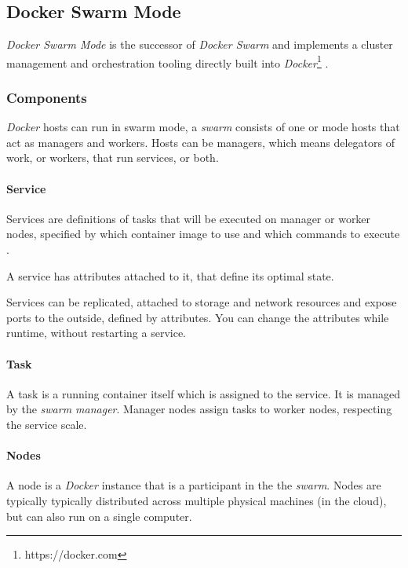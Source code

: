 \subsection{Docker Swarm Mode}\label{docker-swarm-mode}

\emph{Docker Swarm Mode} is the successor of \emph{Docker Swarm} and
implements a cluster management and orchestration tooling directly built
into \emph{Docker}\footnote{https://docker.com} .

\subsubsection{Components}\label{components}

\emph{Docker} hosts can run in swarm mode, a \emph{swarm} consists of
one or mode hosts that act as managers and workers. Hosts can be
managers, which means delegators of work, or workers, that run services,
or both. \cite{dock-swarm}

\paragraph{Service}\label{service}

Services are definitions of tasks that will be executed on manager or
worker nodes, specified by which container image to use and which
commands to execute \cite{dock-swarm}.

A service has attributes attached to it, that define its optimal state.

Services can be replicated, attached to storage and network resources
and expose ports to the outside, defined by attributes. You can change
the attributes while runtime, without restarting a service.
\cite{dock-swarm}

\paragraph{Task}\label{task}

A task is a running container itself which is assigned to the service.
It is managed by the \emph{swarm manager}. Manager nodes assign tasks to
worker nodes, respecting the service scale.\cite{dock-swarm}

\paragraph{Nodes}\label{nodes}

A node is a \emph{Docker} instance that is a participant in the the
\emph{swarm}. Nodes are typically typically distributed across multiple
physical machines (in the cloud), but can also run on a single computer.
\cite{dock-swarm}

